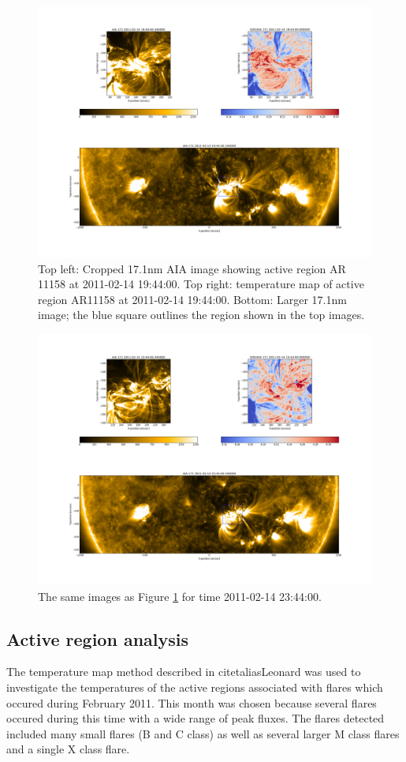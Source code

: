 \documentclass[referee,a4paper,12pt]{swsc}
\begin{document}
\begin{linenumbers}
\begin{figure}
	\centering
		\includegraphics[width=0.9\columnwidth]{20110214T194400with171.png}
	\caption{Top left: Cropped 17.1nm AIA image showing active region AR 11158 at 2011-02-14 19:44:00. Top right: temperature map of active region AR11158 at 2011-02-14 19:44:00. Bottom: Larger 17.1nm image; the blue square outlines the region shown in the top images.}
	\label{fig:trackdemo1}
\end{figure}
\begin{figure}
	\centering
		\includegraphics[width=0.9\columnwidth]{20110214T234400with171.png}
	\caption{The same images as Figure \ref{fig:trackdemo1} for time 2011-02-14 23:44:00.}
	\label{fig:trackdemo2}
\end{figure}

\subsection{Active region analysis}
The temperature map method described in citetalias{Leonard} was used to investigate the temperatures of the active regions associated with flares which occured during February 2011. %
This month was chosen because several flares occured during this time with a wide range of peak fluxes. %
The flares detected included many small flares (B and C class) as well as several larger M class flares and a single X class flare. %


\end{linenumbers}
\end{document}
